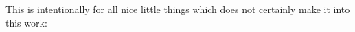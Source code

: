 This is intentionally for all nice little things which does not certainly make it into this work: \cite{hertz_ueber_1887}
